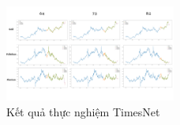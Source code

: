 \begin{figure}[htbp]
	\centerline{\includegraphics[width=0.5\textwidth]{img/TimesNet_result.png}}
	\caption{Kết quả thực nghiệm TimesNet}
	\label{fig}
\end{figure}